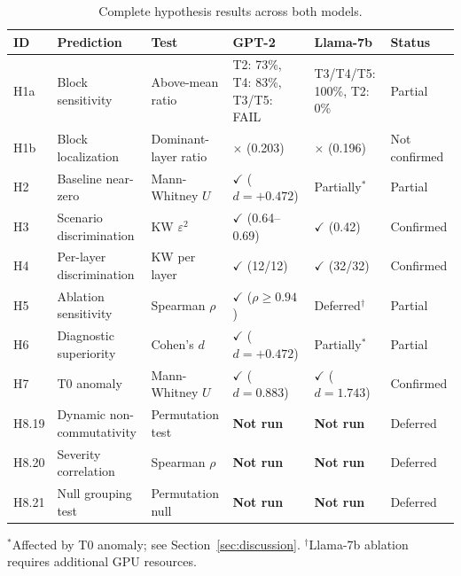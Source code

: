 \begin{table}[h]
\centering
\caption{Complete hypothesis results across both models.}
\label{tab:results-summary}
\small
\begin{tabular}{@{}llllll@{}}
\toprule
\textbf{ID} & \textbf{Prediction} & \textbf{Test} & \textbf{GPT-2} & \textbf{Llama-7b} &
\textbf{Status} \\
\midrule
H1a & Block sensitivity & Above-mean ratio & T2: 73\%, T4: 83\%,
T3/T5: FAIL & T3/T4/T5: 100\%,
T2: 0\% & Partial \\
H1b & Block localization & Dominant-layer ratio & $\times$ (0.203) & $\times$ (0.196) &
Not confirmed \\
H2 & Baseline near-zero & Mann-Whitney $U$ & $\checkmark$ ($d{=}+0.472$) & Partially$^*$ &
Partial \\
H3 & Scenario discrimination & KW $\varepsilon^2$ & $\checkmark$ (0.64--0.69) &
$\checkmark$ (0.42) & Confirmed \\
H4 & Per-layer discrimination & KW per layer & $\checkmark$ (12/12) &
$\checkmark$ (32/32) & Confirmed \\
H5 & Ablation sensitivity & Spearman $\rho$ & $\checkmark$ ($\rho{\geq}0.94$) &
Deferred$^\dagger$ & Partial \\
H6 & Diagnostic superiority & Cohen's $d$ & $\checkmark$ ($d{=}+0.472$) & Partially$^*$ &
Partial \\
H7 & T0 anomaly & Mann-Whitney $U$ & $\checkmark$ ($d{=}0.883$) &
$\checkmark$ ($d{=}1.743$) & Confirmed \\
H8.19 & Dynamic non-commutativity & Permutation test & \textbf{Not run} &
\textbf{Not run} & Deferred \\
H8.20 & Severity correlation & Spearman $\rho$ & \textbf{Not run} &
\textbf{Not run} & Deferred \\
H8.21 & Null grouping test & Permutation null & \textbf{Not run} &
\textbf{Not run} & Deferred \\
\bottomrule
\end{tabular}

\medskip
{\footnotesize $^*$Affected by T0 anomaly; see Section~\ref{sec:discussion}.
$^\dagger$Llama-7b ablation requires additional GPU resources.}
\end{table}

